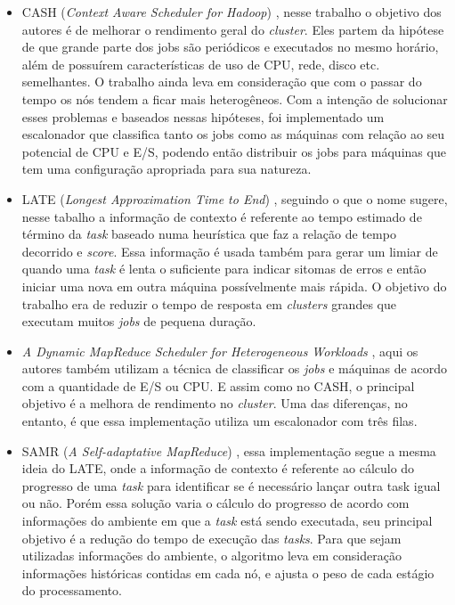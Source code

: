 \begin{itemize}
\item CASH (\emph{Context Aware Scheduler for Hadoop}) \cite{CASH}, nesse trabalho o objetivo dos autores é de melhorar o rendimento geral do \emph{cluster}. Eles partem da hipótese de que grande parte dos jobs são periódicos e executados no mesmo horário, além de possuírem características de uso de CPU, rede, disco etc. semelhantes. O trabalho ainda leva em consideração que com o passar do tempo os nós tendem a ficar mais heterogêneos. Com a intenção de solucionar esses problemas e baseados nessas hipóteses, foi implementado um escalonador que classifica tanto os jobs como as máquinas com relação ao seu potencial de CPU e E/S, podendo então distribuir os jobs para máquinas que tem uma configuração apropriada para sua natureza.

\item LATE (\emph{Longest Approximation Time to End}) \cite{LATE}, seguindo o que o nome sugere, nesse tabalho a informação de contexto é referente ao tempo estimado de término da \emph{task} baseado numa heurística que faz a relação de tempo decorrido e \emph{score}. Essa informação é usada também para gerar um limiar de quando uma \emph{task} é lenta o suficiente para indicar sitomas de erros e então iniciar uma nova em outra máquina possívelmente mais rápida. O objetivo do trabalho era de reduzir o tempo de resposta em \emph{clusters} grandes que executam muitos \emph{jobs} de pequena duração.

\item \emph{A Dynamic MapReduce Scheduler for Heterogeneous Workloads} \cite{DMRSHW}, aqui os autores também utilizam a técnica de classificar os \emph{jobs} e máquinas de acordo com a quantidade de E/S ou CPU. E assim como no CASH, o principal objetivo é a melhora de rendimento no \emph{cluster}. Uma das diferenças, no entanto, é que essa implementação utiliza um escalonador com três filas.

\item SAMR (\emph{A Self-adaptative MapReduce}) \cite{SAMR}, essa implementação segue a mesma ideia do LATE, onde a informação de contexto é referente ao cálculo do progresso de uma \emph{task} para identificar se é necessário lançar outra task igual ou não. Porém essa solução varia o cálculo do progresso de acordo com informações do ambiente em que a \emph{task} está sendo executada, seu principal objetivo é a redução do tempo de execução das \emph{tasks}. Para que sejam utilizadas informações do ambiente, o algoritmo leva em consideração informações históricas contidas em cada nó, e ajusta o peso de cada estágio do processamento.


\end{itemize}
